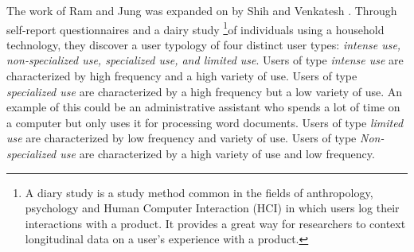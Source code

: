 \documentclass{acm_proc_article-sp}
\begin{document}
The work of Ram and Jung was expanded on by Shih and Venkatesh \cite{shih2004beyond}.  Through self-report questionnaires and a dairy study \footnote{A diary study is a study method common in the fields of anthropology, psychology and Human Computer Interaction (HCI) in which users log their interactions with a product. It provides a great way for researchers to context longitudinal data on a user's experience with a product.}of individuals using a household technology, they discover a user typology of four distinct user types: \textit{intense use, non-specialized use, specialized use, and limited use}.
Users of type \textit{intense use} are characterized by high frequency and a high variety of use. Users of type \textit{specialized use} are characterized by a high frequency but a low variety of use. An example of this could be an administrative assistant who spends a lot of time on a computer but only uses it for processing word documents. Users of type \textit{limited use} are characterized by low frequency and variety of use. Users of type \textit{Non-specialized use} are characterized by a high variety of use and low frequency.
\end{document}
